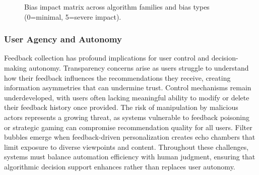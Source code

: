 \begin{figure*}[ht]
\caption{Bias impact matrix across algorithm families and bias types (0=minimal, 5=severe impact).}
\label{fig:bias_impact_matrix}
\end{figure*}

\subsubsection{User Agency and Autonomy}

Feedback collection has profound implications for user control and decision-making autonomy. Transparency concerns arise as users struggle to understand how their feedback influences the recommendations they receive, creating information asymmetries that can undermine trust. Control mechanisms remain underdeveloped, with users often lacking meaningful ability to modify or delete their feedback history once provided. The risk of manipulation by malicious actors represents a growing threat, as systems vulnerable to feedback poisoning or strategic gaming can compromise recommendation quality for all users. Filter bubbles emerge when feedback-driven personalization creates echo chambers that limit exposure to diverse viewpoints and content. Throughout these challenges, systems must balance automation efficiency with human judgment, ensuring that algorithmic decision support enhances rather than replaces user autonomy.

